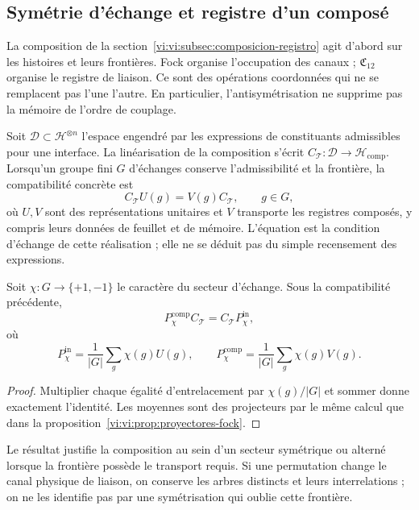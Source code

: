 \subsection{Symétrie d’échange et registre d’un composé}
\label{vi:vi:subsec:pauli-composicion}

La composition de la section~\ref{vi:vi:subsec:composicion-registro}
agit d’abord sur les histoires et leurs frontières. Fock organise
l’occupation des canaux ; \(\mathfrak C_{12}\) organise le
registre de liaison. Ce sont des opérations coordonnées qui ne se
remplacent pas l’une l’autre. En particulier, l’antisymétrisation ne
supprime pas la mémoire de l’ordre de couplage.

Soit \(\mathcal D\subset\mathcal H^{\otimes n}\) l’espace
engendré par les expressions de constituants admissibles pour une
interface. La linéarisation de la composition s’écrit
\(C_{\mathcal T}:\mathcal D\to\mathcal H_{\mathrm{comp}}\).
Lorsqu’un groupe fini \(G\) d’échanges conserve
l’admissibilité et la frontière, la compatibilité concrète est
\[
 C_{\mathcal T}U(g)=V(g)C_{\mathcal T},\qquad g\in G,
\]
où \(U,V\) sont des représentations unitaires et \(V\) transporte
les registres composés, y compris leurs données de feuillet et de mémoire.
L’équation est la condition
d’échange de cette réalisation ; elle ne se déduit pas du simple
recensement des expressions.

\begin{proposition}
\label{vi:vi:prop:composicion-estadistica}
Soit \(\chi:G\to\{+1,-1\}\) le caractère du secteur
d’échange. Sous la compatibilité précédente,
\[
 P_\chi^{\mathrm{comp}}C_{\mathcal T}
 =C_{\mathcal T}P_\chi^{\mathrm{in}},
\]
où
\[
 P_\chi^{\mathrm{in}}=\frac1{|G|}\sum_g\chi(g)U(g),
 \qquad
 P_\chi^{\mathrm{comp}}=\frac1{|G|}\sum_g\chi(g)V(g).
\]
\end{proposition}
\begin{proof}
Multiplier chaque égalité d’entrelacement par
\(\chi(g)/|G|\) et sommer donne exactement l’identité.
Les moyennes sont des projecteurs par le même calcul que dans
la proposition~\ref{vi:vi:prop:proyectores-fock}.
\end{proof}

Le résultat justifie la composition au sein d’un secteur symétrique
ou alterné lorsque la frontière possède le transport requis.
Si une permutation change le canal physique de liaison, on
conserve les arbres distincts et leurs interrelations ; on ne les
identifie pas par une symétrisation qui oublie cette frontière.


